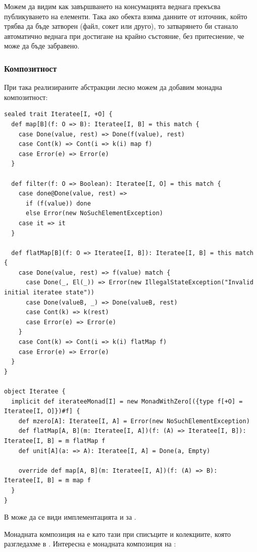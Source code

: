 Можем да видим как завършването на консумацията веднага прекъсва публикуването на елементи. Така ако  обекта взима данните от източник, който трябва да бъде затворен (файл, сокет или друго), то затварянето би станало автоматично веднага при достигане на крайно състояние, без притеснение, че може да бъде забравено.

\subsubsection{Композитност}

При така реализираните абстракции лесно можем да добавим монадна композитност:

\begin{lstlisting}
sealed trait Iteratee[I, +O] {
  def map[B](f: O => B): Iteratee[I, B] = this match {
    case Done(value, rest) => Done(f(value), rest)
    case Cont(k) => Cont(i => k(i) map f)
    case Error(e) => Error(e)
  }
  
  def filter(f: O => Boolean): Iteratee[I, O] = this match {
    case done@Done(value, rest) =>
      if (f(value)) done
      else Error(new NoSuchElementException)
    case it => it
  }
  
  def flatMap[B](f: O => Iteratee[I, B]): Iteratee[I, B] = this match {
    case Done(value, rest) => f(value) match {
      case Done(_, El(_)) => Error(new IllegalStateException("Invalid initial iteratee state"))
      case Done(valueB, _) => Done(valueB, rest)
      case Cont(k) => k(rest)
      case Error(e) => Error(e)
    }
    case Cont(k) => Cont(i => k(i) flatMap f)
    case Error(e) => Error(e)
  }
}

object Iteratee {
  implicit def iterateeMonad[I] = new MonadWithZero[({type f[+O] = Iteratee[I, O]})#f] {
    def mzero[A]: Iteratee[I, A] = Error(new NoSuchElementException)
    def flatMap[A, B](m: Iteratee[I, A])(f: (A) => Iteratee[I, B]): Iteratee[I, B] = m flatMap f
    def unit[A](a: => A): Iteratee[I, A] = Done(a, Empty)
    
    override def map[A, B](m: Iteratee[I, A])(f: (A) => B): Iteratee[I, B] = m map f
  }
}
\end{lstlisting}

В  може да се види имплементацията и за . 

Монадната композиция на  е като тази при списъците и колекциите, която разгледахме в . Интересна е монадната композиция на :

